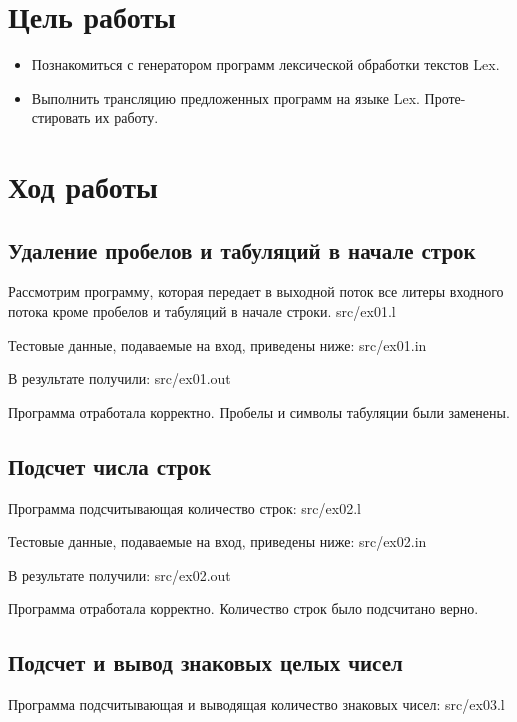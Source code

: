 





\section{Цель работы}
\begin{itemize}
\item Познакомиться с генератором программ лексической обработки текстов Lex.
\item Выполнить трансляцию предложенных программ на языке Lex. Проте-стировать их работу.
\end{itemize}


\section{Ход работы}
\subsection{Удаление пробелов и табуляций в начале строк}
Рассмотрим программу, которая передает в выходной поток все литеры входного потока кроме пробелов и табуляций в начале строки.
 {src/ex01.l}

Тестовые данные, подаваемые на вход, приведены ниже:
 {src/ex01.in}

В результате получили:
 {src/ex01.out}

Программа отработала корректно. Пробелы и символы табуляции были заменены.

\subsection{Подсчет числа строк}
Программа подсчитывающая количество строк:
 {src/ex02.l}

Тестовые данные, подаваемые на вход, приведены ниже:
 {src/ex02.in}

В результате получили:
 {src/ex02.out}

Программа отработала корректно. Количество строк было подсчитано верно.

\subsection{Подсчет и вывод знаковых целых чисел}
Программа подсчитывающая и выводящая количество знаковых чисел:
 {src/ex03.l}

